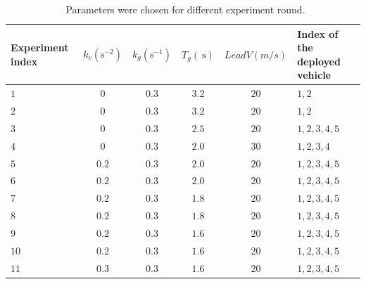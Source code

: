 \documentclass[a4paper]{cas-sc}
\begin{document}
\begin{table}
  \centering
  \setlength{\abovecaptionskip}{0pt}
  \setlength{\belowcaptionskip}{10pt}%
  \caption{~Parameters were chosen for different experiment round.}
  {\begin{tabular}{lccccl} \toprule
      Experiment index & $k_{v} (\mathrm{s}^{-2})$ & $k_{g} (\mathrm{s}^{-1})$ & $T_{g} (\mathrm{~s})$ & $LeadV (m/s)$ & Index of the deployed vehicle \\ \midrule
      $1 $             & $0$                       & $0.3 $                    & $3.2$                 & $20$          & $1,2$                         \\
      $2 $             & $0$                       & $0.3 $                    & $3.2$                 & $20$          & $1,2$                         \\
      $3 $             & $0$                       & $0.3 $                    & $2.5$                 & $20$          & $1,2,3,4,5$                   \\
      $4 $             & $0$                       & $0.3 $                    & $2.0$                 & $30$          & $1,2,3,4$                     \\
      $5 $             & $0.2$                     & $0.3 $                    & $2.0$                 & $20$          & $1,2,3,4,5$                   \\
      $6 $             & $0.2$                     & $0.3 $                    & $2.0$                 & $20$          & $1,2,3,4,5$                   \\
      $7 $             & $0.2$                     & $0.3 $                    & $1.8$                 & $20$          & $1,2,3,4,5$                   \\
      $8 $             & $0.2$                     & $0.3 $                    & $1.8$                 & $20$          & $1,2,3,4,5$                   \\
      $9 $             & $0.2$                     & $0.3 $                    & $1.6$                 & $20$          & $1,2,3,4,5$                   \\
      $10$             & $0.2$                     & $0.3 $                    & $1.6$                 & $20$          & $1,2,3,4,5$                   \\
      $11$             & $0.3$                     & $0.3 $                    & $1.6$                 & $20$          & $1,2,3,4,5$                   \\

\end{tabular}}
\end{table}
\end{document}
